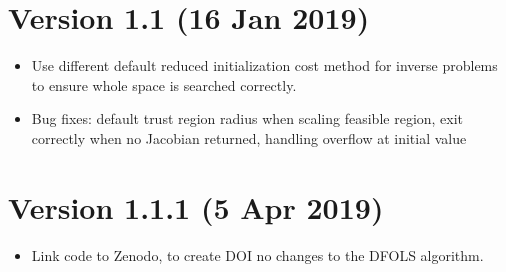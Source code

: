 \documentclass[letterpaper,10pt,english]{sphinxmanual}
\begin{document}
\section{Version 1.1 (16 Jan 2019)}
\label{\detokenize{history:version-1-1-16-jan-2019}}\begin{itemize}
\item {} 
\sphinxAtStartPar
Use different default reduced initialization cost method for inverse problems to ensure whole space is searched correctly.

\item {} 
\sphinxAtStartPar
Bug fixes: default trust region radius when scaling feasible region, exit correctly when no Jacobian returned, handling overflow at initial value

\end{itemize}


\section{Version 1.1.1 (5 Apr 2019)}
\label{\detokenize{history:version-1-1-1-5-apr-2019}}\begin{itemize}
\item {} 
\sphinxAtStartPar
Link code to Zenodo, to create DOI \sphinxhyphen{} no changes to the DFO\sphinxhyphen{}LS algorithm.

\end{itemize}
\end{document}
